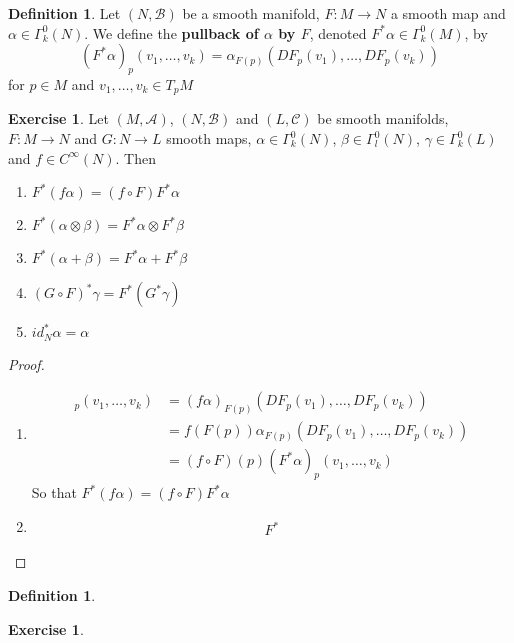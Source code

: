 \documentclass{book}
\theoremstyle{definition}
\newtheorem{defn}[definition]{Definition}
\newtheorem{ex}[definition]{Exercise}
\newcommand{\al}{\alpha}
\newcommand{\be}{\beta}
\newcommand{\gam}{\gamma}
\newcommand{\Gam}{\Gamma}
\newcommand{\MA}{\mathcal{A}}
\newcommand{\MB}{\mathcal{B}}
\newcommand{\MC}{\mathcal{C}}
\DeclareMathOperator*{\0}{\mbf{0}}
\DeclareMathOperator*{\1}{\mbf{1}}
\newcommand{\tbf}[1]{\textbf{#1}}
\begin{document}
	\begin{defn}
	Let $(N, \MB)$ be a smooth manifold, $F:M \rightarrow N$ a smooth map and $\al \in \Gam^0_k(N)$. We define the \tbf{pullback of $\al$ by $F$}, denoted $F^*\al \in \Gam^0_k(M)$, by  $$(F^*\al)_p(v_1, \dots, v_k) = \al_{F(p)} (DF_p(v_1), \dots, DF_p(v_k))$$ for $p \in M$ and $v_1, \dots, v_k \in T_pM$
	\end{defn}

	\begin{ex}
	Let $(M, \MA)$, $(N, \MB)$ and $(L, \MC)$ be smooth manifolds, $F:M \rightarrow N$ and $G:N \rightarrow L$ smooth maps, $\al \in \Gam^0_k(N)$, $\be  \in \Gam^0_l(N)$, $\gam \in \Gam^0_k(L)$ and $f \in C^{\infty}(N)$. Then 
	\begin{enumerate}
	\item $F^*(f \al) = (f \circ F) F^* \al$
	\item $F^*(\al \otimes \be) = F^*\al \otimes F^* \be$
	\item $F^*(\al + \be) = F^* \al + F^* \be $
	\item $(G \circ F)^*\gam = F^*(G^* \gam)$
	\item $id_N^* \al = \al$
	\end{enumerate}
	\end{ex}
	
	\begin{proof}\
	\begin{enumerate}
	\item 
	\begin{align*}
	[F^*(f \al)]_p(v_1, \dots, v_k) 
	&= (f \al )_{F(p)}(DF_p(v_1), \dots, DF_p(v_k)) \\
	&= f (F(p)) \al_{F(p)} (DF_p(v_1), \dots, DF_p(v_k)) \\
	&= (f \circ F)(p) (F^*\al)_p(v_1, \dots, v_k)
	\end{align*}
	So that $F^*(f \al) = (f \circ F) F^* \al$
	\item 
	\begin{align*}
		F^*
	\end{align*}
	\end{enumerate}
	
	\end{proof}
	
	
	
	
	
	\begin{defn}
	
	\end{defn}

	
	\begin{ex}
	
	\end{ex}
	
\end{document}
